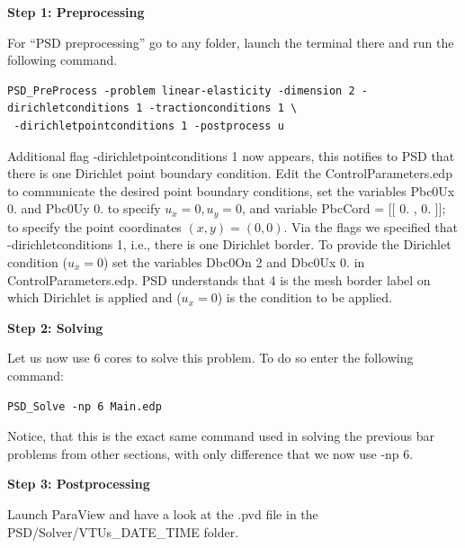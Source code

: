 {{\textbf{Step 1: Preprocessing}

For ``PSD preprocessing'' go to any folder, launch the terminal there and run the following command.
\begin{lstlisting}[style=Linux]
PSD_PreProcess -problem linear-elasticity -dimension 2 -dirichletconditions 1 -tractionconditions 1 \
 -dirichletpointconditions 1 -postprocess u
\end{lstlisting}

Additional flag {\ttfamily -dirichletpointconditions 1} now appears, this notifies to PSD that there is one Dirichlet point boundary condition. Edit the  {\ttfamily ControlParameters.edp} to communicate the desired point boundary conditions, set the variables {\ttfamily Pbc0Ux  0.} and {\ttfamily Pbc0Uy  0.} to specify $u_x=0,u_y=0$, and variable {\ttfamily PbcCord = [[  0. , 0. ]];} to specify the point coordinates $(x,y)=(0,0)$. Via the flags we specified that {\ttfamily -dirichletconditions 1}, i.e., there is one Dirichlet border.
To provide the Dirichlet condition ($u_x=0$) set the variables {\ttfamily Dbc0On 2} and {\ttfamily Dbc0Ux 0.}  in {\ttfamily ControlParameters.edp}. PSD understands that 4 is the mesh border label on which Dirichlet is applied and ($u_x=0$) is the condition to be applied.

\textbf{Step 2: Solving}

Let us now use 6 cores to solve this problem. To do so enter the following command:

\begin{lstlisting}[style=Linux]
PSD_Solve -np 6 Main.edp
\end{lstlisting}
%
Notice, that this is the exact same command used in solving the previous bar problems from other sections, with only difference that we now use {\ttfamily -np 6}.


\textbf{Step 3: Postprocessing}

Launch ParaView and have a look at the  {\ttfamily .pvd} file in the  {\ttfamily PSD/Solver/VTUs\_DATE\_TIME} folder. 

}}
